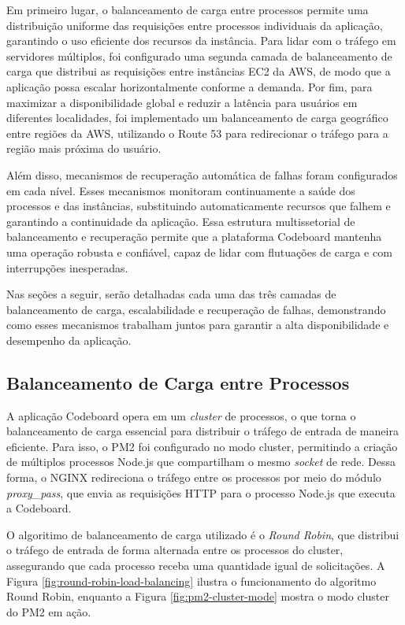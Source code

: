 Em primeiro lugar, o balanceamento de carga entre processos permite uma distribuição uniforme das requisições entre processos individuais da aplicação, garantindo o uso eficiente dos recursos da instância. Para lidar com o tráfego em servidores múltiplos, foi configurado uma segunda camada de balanceamento de carga que distribui as requisições entre instâncias EC2 da AWS, de modo que a aplicação possa escalar horizontalmente conforme a demanda. Por fim, para maximizar a disponibilidade global e reduzir a latência para usuários em diferentes localidades, foi implementado um balanceamento de carga geográfico entre regiões da AWS, utilizando o Route 53 para redirecionar o tráfego para a região mais próxima do usuário. 

Além disso, mecanismos de recuperação automática de falhas foram configurados em cada nível. Esses mecanismos monitoram continuamente a saúde dos processos e das instâncias, substituindo automaticamente recursos que falhem e garantindo a continuidade da aplicação. Essa estrutura multissetorial de balanceamento e recuperação permite que a plataforma Codeboard mantenha uma operação robusta e confiável, capaz de lidar com flutuações de carga e com interrupções inesperadas.

Nas seções a seguir, serão detalhadas cada uma das três camadas de balanceamento de carga, escalabilidade e recuperação de falhas, demonstrando como esses mecanismos trabalham juntos para garantir a alta disponibilidade e desempenho da aplicação.

\subsection{Balanceamento de Carga entre Processos}

A aplicação Codeboard opera em um \emph{cluster} de processos, o que torna o balanceamento de carga essencial para distribuir o tráfego de entrada de maneira eficiente. Para isso, o PM2 foi configurado no modo cluster, permitindo a criação de múltiplos processos Node.js que compartilham o mesmo \emph{socket} de rede. Dessa forma, o NGINX redireciona o tráfego entre os processos por meio do módulo \emph{proxy\_pass}, que envia as requisições HTTP para o processo Node.js que executa a Codeboard.

O algoritimo de balanceamento de carga utilizado é o \emph{Round Robin}, que distribui o tráfego de entrada de forma alternada entre os processos do cluster, assegurando que cada processo receba uma quantidade igual de solicitações. A Figura \ref{fig:round-robin-load-balancing} ilustra o funcionamento do algoritmo Round Robin, enquanto a Figura \ref{fig:pm2-cluster-mode} mostra o modo cluster do PM2 em ação.

